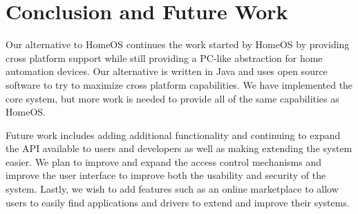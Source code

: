 \section{Conclusion and Future Work}
\label{sec:future}
Our alternative to HomeOS continues the work started by HomeOS by providing
cross platform support while still providing a PC-like abstraction for home
automation devices. Our alternative is written in Java and uses open source
software to try to maximize cross platform capabilities. We have implemented the
core system, but more work is needed to provide all of the same capabilities as
HomeOS.

Future work includes adding additional functionality and continuing to expand
the API available to users and developers as well as making extending the system
easier. We plan to improve and expand the access control mechanisms and improve
the user interface to improve both the usability and security of the system.
Lastly, we wish to add features such as an online marketplace to allow users to
easily find applications and drivers to extend and improve their systems.
